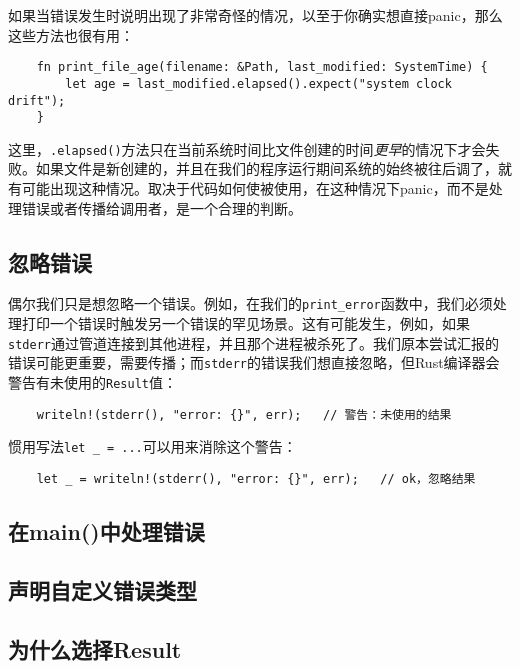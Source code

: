 如果当错误发生时说明出现了非常奇怪的情况，以至于你确实想直接panic，那么这些方法也很有用：
\begin{verbatim}
    fn print_file_age(filename: &Path, last_modified: SystemTime) {
        let age = last_modified.elapsed().expect("system clock drift");
    }
\end{verbatim}

这里，\texttt{.elapsed()}方法只在当前系统时间比文件创建的时间\emph{更早}的情况下才会失败。如果文件是新创建的，并且在我们的程序运行期间系统的始终被往后调了，就有可能出现这种情况。取决于代码如何使被使用，在这种情况下panic，而不是处理错误或者传播给调用者，是一个合理的判断。

\subsection{忽略错误}\label{ignoreerr}
偶尔我们只是想忽略一个错误。例如，在我们的\texttt{print\_error}函数中，我们必须处理打印一个错误时触发另一个错误的罕见场景。这有可能发生，例如，如果\texttt{stderr}通过管道连接到其他进程，并且那个进程被杀死了。我们原本尝试汇报的错误可能更重要，需要传播；而\texttt{stderr}的错误我们想直接忽略，但Rust编译器会警告有未使用的\texttt{Result}值：
\begin{verbatim}
    writeln!(stderr(), "error: {}", err);   // 警告：未使用的结果
\end{verbatim}

惯用写法\texttt{let \_ = ...}可以用来消除这个警告：
\begin{verbatim}
    let _ = writeln!(stderr(), "error: {}", err);   // ok，忽略结果
\end{verbatim}

\subsection{在main()中处理错误}

\subsection{声明自定义错误类型}

\subsection{为什么选择Result}
